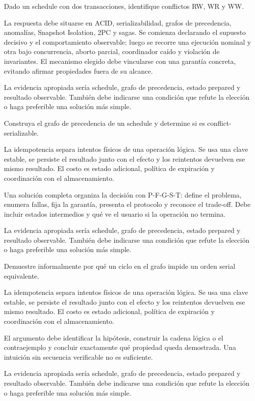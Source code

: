 \documentclass[variant=guia,cover=institutional,mode=screen]{ua-engineering-v6-article}
\begin{document}
\begin{uaexercise}
Dado un schedule con dos transacciones, identifique conflictos RW, WR y WW.
\end{uaexercise}
\begin{uaanswer}
La respuesta debe situarse en ACID, serializabilidad, grafos de precedencia, anomalías, Snapshot Isolation, 2PC y sagas. Se comienza declarando el supuesto decisivo y el comportamiento observable; luego se recorre una ejecución nominal y otra bajo concurrencia, aborto parcial, coordinador caído y violación de invariantes. El mecanismo elegido debe vincularse con una garantía concreta, evitando afirmar propiedades fuera de su alcance.

La evidencia apropiada sería schedule, grafo de precedencia, estado prepared y resultado observable. También debe indicarse una condición que refute la elección o haga preferible una solución más simple.
\end{uaanswer}

\begin{uaexercise}
Construya el grafo de precedencia de un schedule y determine si es conflict-serializable.
\end{uaexercise}
\begin{uaanswer}
La idempotencia separa intentos físicos de una operación lógica. Se usa una clave estable, se persiste el resultado junto con el efecto y los reintentos devuelven ese mismo resultado. El costo es estado adicional, política de expiración y coordinación con el almacenamiento.

Una solución completa organiza la decisión con P-F-G-S-T: define el problema, enumera fallas, fija la garantía, presenta el protocolo y reconoce el trade-off. Debe incluir estados intermedios y qué ve el usuario si la operación no termina.

La evidencia apropiada sería schedule, grafo de precedencia, estado prepared y resultado observable. También debe indicarse una condición que refute la elección o haga preferible una solución más simple.
\end{uaanswer}

\begin{uaexercise}
Demuestre informalmente por qué un ciclo en el grafo impide un orden serial equivalente.
\end{uaexercise}
\begin{uaanswer}
La idempotencia separa intentos físicos de una operación lógica. Se usa una clave estable, se persiste el resultado junto con el efecto y los reintentos devuelven ese mismo resultado. El costo es estado adicional, política de expiración y coordinación con el almacenamiento.

El argumento debe identificar la hipótesis, construir la cadena lógica o el contraejemplo y concluir exactamente qué propiedad queda demostrada. Una intuición sin secuencia verificable no es suficiente.

La evidencia apropiada sería schedule, grafo de precedencia, estado prepared y resultado observable. También debe indicarse una condición que refute la elección o haga preferible una solución más simple.
\end{uaanswer}
\end{document}
